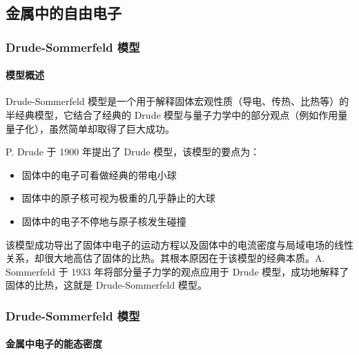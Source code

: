 \documentclass[ignorenonframetext, t]{beamer}
\begin{document}
\subsection{金属中的自由电子}

\begin{frame}
	\frametitle{Drude-Sommerfeld 模型}
	\framesubtitle{模型概述}
	Drude-Sommerfeld 模型是一个用于解释固体宏观性质（导电、传热、比热等）的半经典模型，它结合了经典的 Drude 模型与量子力学中的部分观点（例如作用量量子化），虽然简单却取得了巨大成功。
	\begin{background}
	P. Drude 于 1900 年提出了 Drude 模型，该模型的要点为：
	\begin{itemize}
	\item 固体中的电子可看做经典的带电小球
	\item 固体中的原子核可视为极重的几乎静止的大球
	\item 固体中的电子不停地与原子核发生碰撞
	\end{itemize}
	该模型成功导出了固体中电子的运动方程以及固体中的电流密度与局域电场的线性关系，却很大地高估了固体的比热。其根本原因在于该模型的经典本质。A. Sommerfeld 于 1933 年将部分量子力学的观点应用于 Drude 模型，成功地解释了固体的比热，这就是 Drude-Sommerfeld 模型。
	\end{background}
\end{frame}

\begin{frame}
	\frametitle{Drude-Sommerfeld 模型}
	\framesubtitle{金属中电子的能态密度}
\end{frame}
\end{document}
